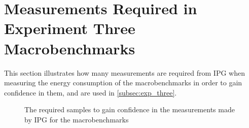 \section{Measurements Required in Experiment Three Macrobenchmarks}\label{app:exp_three_coch_app}

This section illustrates how many measurements are required from IPG when measuring the energy consumption of the macrobenchmarks in order to gain confidence in them, and are used in \cref{subsec:exp_three}.


\begin{figure}[H]
    \centering
    \begin{subfigure}[b]{0.4\textwidth}
        \centering
        
    \end{subfigure}
    \hfill
    \begin{subfigure}[b]{0.4\textwidth}
        \centering
        
    \end{subfigure}
    \caption{The required samples to gain confidence in the measurements made by IPG for the macrobenchmarks}
\end{figure}